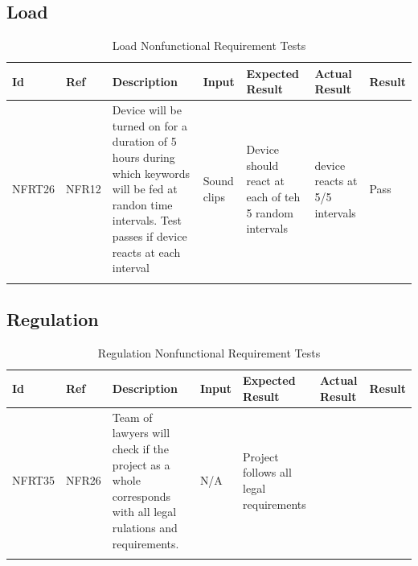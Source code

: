 \documentclass[12pt, titlepage]{article}
\begin{document}
\subsection{Load}

\begin{longtable}{|p{1.4cm}|p{1.1cm}|p{2.5cm}|p{1.5cm}|p{2.2cm}|p{1.9cm}|p{1.2cm}|}

  \endfirsthead
  \endhead
  \hline
  \textbf{Id} & \textbf{Ref} & \textbf{Description}                                                         & \textbf{Input}                                    & \textbf{Expected Result}    & \textbf{Actual Result}                          & \textbf{Result}                                     \\ \hline
  NFRT26        & NFR12          & Device will be turned on for a duration of 5 hours during which keywords will be fed at randon time intervals. Test passes if device reacts at each interval                & Sound clips       & Device should react at each of teh 5 random intervals        & device reacts at 5/5 intervals      & {\color[HTML]{32CB00} Pass}                         \\ \hline
  \caption{Load Nonfunctional Requirement Tests}
  \label{LoadNonfunctionalRequirementTests}
\end{longtable}

\subsection{Regulation}

\begin{longtable}{|p{1.4cm}|p{1.1cm}|p{2.5cm}|p{1.5cm}|p{2.2cm}|p{1.9cm}|p{1.2cm}|}

  \endfirsthead
  \endhead
  \hline
  \textbf{Id} & \textbf{Ref} & \textbf{Description}                                                         & \textbf{Input}                                    & \textbf{Expected Result}    & \textbf{Actual Result}                          & \textbf{Result}                                     \\ \hline
  NFRT35        & NFR26          & Team of lawyers will check if the project as a whole corresponds with all legal rulations and requirements.                & N/A         & Project follows all legal requirements           &          & \cellcolor[HTML]{FFFFFF}{\color[HTML]{F8A102} TBD}                        \\ \hline
  \caption{Regulation Nonfunctional Requirement Tests}
  \label{RegulationNonfunctionalRequirementTests}
\end{longtable}
\end{document}
